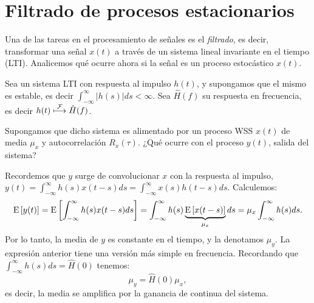 \section{Filtrado de procesos estacionarios}\label{sec:filtrado wss}

Una de las tareas en el procesamiento de señales es el \emph{filtrado}, es decir, transformar una señal $x(t)$ a través de un sistema lineal invariante en el tiempo (LTI). Analicemos qué ocurre ahora si la señal es un proceso estocástico $x(t)$.

Sea un sistema LTI con respuesta al impulso $h(t)$, y supongamos que el mismo es estable, es decir $\int_{-\infty}^\infty |h(s)| ds <\infty$. Sea $\hat{H}(f)$ su respuesta en frecuencia, es decir $h(t) \;\displaystyle{\mathop{\longmapsto}^{\mathcal{F}}}\; \hat{H}(f)$.

Supongamos que dicho sistema es alimentado por un proceso WSS $x(t)$ de media $\mu_x$ y autocorrelación $R_x(\tau)$. ¿Qué ocurre con el proceso $y(t)$, salida del sistema?

Recordemos que $y$ surge de convolucionar $x$ con la respuesta al impulso, $y(t) = \int_{-\infty}^\infty h(s)x(t-s)ds = \int_{-\infty}^\infty x(s)h(t-s)ds$. Calculemos:
\begin{equation}\label{eq:media del filtrado}
    \mathrm{E}\left[y(t)\right] = \mathrm{E}\left[\int_{-\infty}^\infty h(s)x(t-s)ds\right] = \int_{-\infty}^\infty h(s)\underbrace{\mathrm{E}\left[x(t-s)\right]}_{\mu_x}ds = \mu_x  \int_{-\infty}^\infty h(s) ds.
\end{equation}
Por lo tanto, la media de $y$ es constante en el tiempo, y la denotamos $\mu_y$. La expresión anterior tiene una versión más simple en frecuencia. Recordando que $\int_{-\infty}^\infty h(s)ds = \hat{H}(0)$ tenemos:
\begin{equation*}
    \mu_y = \hat{H}(0) \mu_x,
\end{equation*}
es decir, la media se amplifica por la ganancia de continua del sistema.

